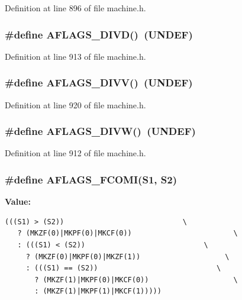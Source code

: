 Definition at line 896 of file machine.h.
\subsubsection[{AFLAGS\_\-DIVD}]{\setlength{\rightskip}{0pt plus 5cm}\#define AFLAGS\_\-DIVD()~(UNDEF)}\label{machine_8h_294d7e14bef86c29bffb9a5841ed01f8}




Definition at line 913 of file machine.h.
\subsubsection[{AFLAGS\_\-DIVV}]{\setlength{\rightskip}{0pt plus 5cm}\#define AFLAGS\_\-DIVV()~(UNDEF)}\label{machine_8h_fc263d48ab47fc9edd3e4dde47ae217e}




Definition at line 920 of file machine.h.
\subsubsection[{AFLAGS\_\-DIVW}]{\setlength{\rightskip}{0pt plus 5cm}\#define AFLAGS\_\-DIVW()~(UNDEF)}\label{machine_8h_93ddd02e72d30264fade6df215dddd23}




Definition at line 912 of file machine.h.
\subsubsection[{AFLAGS\_\-FCOMI}]{\setlength{\rightskip}{0pt plus 5cm}\#define AFLAGS\_\-FCOMI(S1, \/  S2)}\label{machine_8h_89c44caf48a751b051d108813b2459e5}


\textbf{Value:}

\begin{Code}\begin{verbatim}(((S1) > (S2))                            \
   ? (MKZF(0)|MKPF(0)|MKCF(0))                        \
   : (((S1) < (S2))                            \
     ? (MKZF(0)|MKPF(0)|MKZF(1))                    \
     : (((S1) == (S2))                            \
       ? (MKZF(1)|MKPF(0)|MKCF(0))                    \
       : (MKZF(1)|MKPF(1)|MKCF(1)))))
\end{verbatim}
\end{Code}


